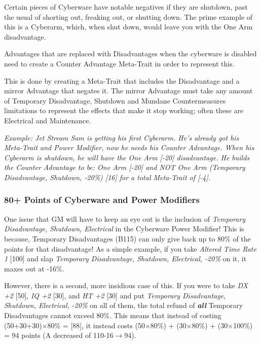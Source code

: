 \begin{multicols*}{3}
	Certain pieces of Cyberware have notable negatives if they are shutdown, past the usual of shorting out, freaking out, or shutting down. The prime example of this is a Cyberarm, which, when shut down, would leave you with the One Arm disadvantage. 
	
	Advantages that are replaced with Disadvantages when the cyberware is disabled need to create a Counter Advantage Meta-Trait in order to represent this.
	
	This is done by creating a Meta-Trait that includes the Disadvantage and a mirror Advantage that negates it. The mirror Advantage must take any amount of Temporary Disadvantage, Shutdown and Mundane Countermeasures limitations to represent the effects that make it stop working; often these are Electrical and Maintenance.
	
	\textit{\textcolor{OliveGreen}{Example: Jet Stream Sam is getting his first Cyberarm. He's already got his Meta-Trait and Power Modifier, now he needs his Counter Advantage. When his Cyberarm is shutdown, he will have the One Arm [-20] disadvantage. He builds the Counter Advantage to be: One Arm [-20] and NOT One Arm (Temporary Disadvantage, Shutdown, -20\%) [16] for a total Meta-Trait of [-4].}}
	
	\subsubsection{80+ Points of Cyberware and Power Modifiers}
	
	One issue that GM will have to keep an eye out is the inclusion of \textit{Temporary Disadvantage, Shutdown, Electrical} in the Cyberware Power Modifier! This is because, Temporary Disadvantages (B115) can only give back up to 80\% of the points for that disadvantage! As a simple example, if you take \textit{Altered Time Rate 1} [100] and slap \textit{Temporary Disadvantage, Shutdown, Electrical, -20\%} on it, it maxes out at -16\%.
	
	However, there is a second, more insidious case of this. If you were to take \textit{DX +2} [50], \textit{IQ +2} [30], and \textit{HT +2} [30] and put \textit{Temporary Disadvantage, Shutdown, Electrical, -20\%} on all of them, the total refund of \textbf{\textit{all}} Temporary Disadvantages cannot exceed 80\%. This means that instead of costing (50+30+30)$\times$80\% = [88], it instead costs (50$\times$80\%) + (30$\times$80\%) + (30$\times$100\%) = 94 points (A decreased of 110-16$\rightarrow$94).
	

\end{multicols*}
